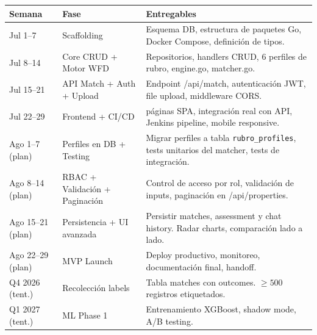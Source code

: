 \documentclass[11pt,a4paper]{article}
\begin{document}
\begin{table}[H]
    \centering
    \renewcommand{\arraystretch}{1.2}
    \begin{tabularx}{\textwidth}{>{\hsize=0.15\hsize}X >{\hsize=0.25\hsize}X >{\hsize=0.6\hsize}X}
        \toprule
        \textbf{Semana} & \textbf{Fase} & \textbf{Entregables} \\
        \midrule
        Jul 1--7 & Scaffolding & Esquema DB, estructura de paquetes Go, Docker Compose, definición de tipos. \\
        Jul 8--14 & Core CRUD + Motor WFD & Repositorios, handlers CRUD, 6 perfiles de rubro, engine.go, matcher.go. \\
        Jul 15--21 & API Match + Auth + Upload & Endpoint /api/match, autenticación JWT, file upload, middleware CORS. \\
        Jul 22--29 & Frontend + CI/CD & 8 páginas SPA, integración real con API, Jenkins pipeline, mobile responsive. \\
        \addlinespace
        Ago 1--7 (plan) & Perfiles en DB + Testing & Migrar perfiles a tabla \texttt{rubro\_profiles}, tests unitarios del matcher, tests de integración. \\
        Ago 8--14 (plan) & RBAC + Validación + Paginación & Control de acceso por rol, validación de inputs, paginación en /api/properties. \\
        Ago 15--21 (plan) & Persistencia + UI avanzada & Persistir matches, assessment y chat history. Radar charts, comparación lado a lado. \\
        Ago 22--29 (plan) & MVP Launch & Deploy productivo, monitoreo, documentación final, handoff. \\
        \addlinespace
        Q4 2026 (tent.) & Recolección labels & Tabla matches con outcomes. $\geq 500$ registros etiquetados. \\
        Q1 2027 (tent.) & ML Phase 1 & Entrenamiento XGBoost, shadow mode, A/B testing. \\
        \bottomrule
    \end{tabularx}
\end{table}
\end{document}
